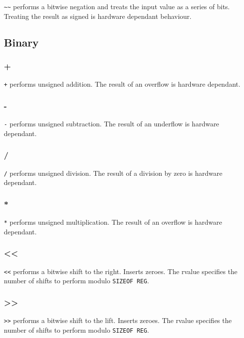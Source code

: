 \verb|~~| performs a bitwise negation and treats the input value as a series of bits. Treating the result as signed is hardware dependant behaviour. 

\subsection{Binary}

\subsubsection{+}

\verb|+| performs unsigned addition. The result of an overflow is hardware dependant. 

\subsubsection{-}

\verb|-| performs unsigned subtraction. The result of an underflow is hardware dependant. 

\subsubsection{/}

\verb|/| performs unsigned division. The result of a division by zero is hardware dependant.

\subsubsection{*}

\verb|*| performs unsigned multiplication. The result of an overflow is hardware dependant. 

\subsubsection{<<}

\verb|<<| performs a bitwise shift to the right. Inserts zeroes. The rvalue specifies the number of shifts to perform modulo \verb|SIZEOF REG|. 

\subsubsection{>>}

\verb|>>| performs a bitwise shift to the lift. Inserts zeroes. The rvalue specifies the number of shifts to perform modulo \verb|SIZEOF REG|. 


